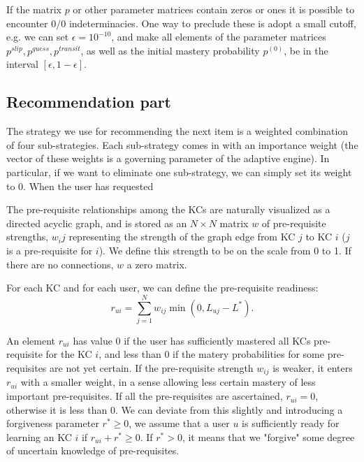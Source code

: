 \documentclass{sigchi}
\newcommand{\1}{\mathbf{1}}
\newcommand{\be}{\begin{equation}}
\newcommand{\ee}{\end{equation}}
\begin{document}
If the matrix $p$ or other parameter matrices contain zeros or ones it is possible to encounter $0/0$ indeterminacies. One way to preclude these is adopt a small cutoff, e.g. we can set $\epsilon=10^{-10}$, and make all elements of the parameter matrices $p^{slip},p^{guess},p^{transit}$, as well as the initial mastery probability $p^{(0)}$, be in the interval $[\epsilon,1-\epsilon]$.

\subsection{Recommendation part}

The strategy we use for recommending the next item is a weighted combination of four sub-strategies. Each sub-strategy comes in with an importance weight (the vector of these weights is a governing parameter of the adaptive engine). In particular, if we want to eliminate one sub-strategy, we can simply set its weight to 0. When the user has requested

The pre-requisite relationships among the KCs are naturally visualized as a directed acyclic graph, and is stored as an $N\times N$ matrix $w$ of pre-requisite strengths, $w_ij$ representing the strength of the graph edge from KC $j$ to KC $i$ ($j$ is a pre-requisite for $i$). We define this strength to be on the scale from 0 to 1. If there are no connections, $w$ a zero matrix.

For each KC and for each user, we can define the pre-requisite readiness:
\be
r_{ui}=\sum_{j=1}^{N}w_{ij}\min\left(0,L_{uj}-L^*\right). \label{readiness}
\ee

An element $r_{ui}$ has value 0 if the user has sufficiently mastered all KCs pre-requisite for the KC $i$, and less than 0 if the matery probabilities for some pre-requisites are not yet certain. If the pre-requisite strength $w_{ij}$ is weaker, it enters $r_{ui}$ with a smaller weight, in a sense allowing less certain mastery of less important pre-requisites. If all the pre-requisites are ascertained, $r_{ui}=0$, otherwise it is less than 0. We can deviate from this slightly and introducing a forgiveness parameter $r^*\geq 0$, we assume that a user $u$ is sufficiently ready for learning an KC $i$ if $r_{ui}+r^*\geq 0$. If $r^*>0$, it means that we "forgive" some degree of uncertain knowledge of pre-requisites.
\end{document}
